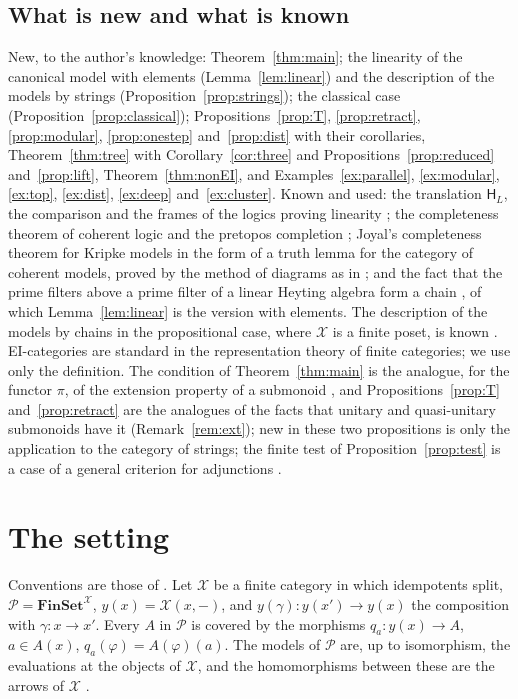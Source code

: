 \documentclass[11pt]{amsart}
\theoremstyle{definition}
\newcommand{\Fin}{\mathbf{FinSet}}
\newcommand{\HH}{\mathsf H}
\newcommand{\cX}{\mathcal X}
\newcommand{\cP}{\mathcal P}
\begin{document}
\subsection*{What is new and what is known}
New, to the author's knowledge: Theorem~\ref{thm:main}; the linearity
of the canonical model with elements (Lemma~\ref{lem:linear}) and the
description of the models by strings
(Proposition~\ref{prop:strings}); the classical case
(Proposition~\ref{prop:classical}); Propositions~\ref{prop:T},
\ref{prop:retract}, \ref{prop:modular}, \ref{prop:onestep}
and~\ref{prop:dist} with
their corollaries, Theorem~\ref{thm:tree} with
Corollary~\ref{cor:three} and Propositions~\ref{prop:reduced}
and~\ref{prop:lift}, Theorem~\ref{thm:nonEI}, and Examples~\ref{ex:parallel},
\ref{ex:modular}, \ref{ex:top}, \ref{ex:dist}, \ref{ex:deep} and~\ref{ex:cluster}. Known and used:
the translation $\HH_L$, the comparison and the frames of the logics
proving linearity \cite{Interm}; the completeness theorem of coherent
logic and the pretopos completion \cite{Elephant}; Joyal's completeness
theorem for Kripke models in the form of a truth lemma for the
category of coherent models, proved by the method of diagrams as in
\cite[Lemma~7.13]{Heyting}; and the fact that the prime filters above
a prime filter of a linear Heyting algebra form a chain \cite{Horn69},
of which Lemma~\ref{lem:linear} is the version with elements.
The description of the models by chains in the propositional case,
where $\cX$ is a finite poset, is known \cite{AGM08,Carai,Interm}.
EI-categories are standard in the representation theory of finite
categories; we use only the definition. The condition of
Theorem~\ref{thm:main} is the analogue, for the functor $\pi$, of the
extension property of a submonoid \cite{Renshaw86}, and
Propositions~\ref{prop:T} and~\ref{prop:retract} are the analogues of
the facts that unitary and quasi-unitary submonoids have it
\cite{RenshawThesis} (Remark~\ref{rem:ext}); new in these two
propositions is only the application to the category of strings; the finite test of
Proposition~\ref{prop:test} is a case of a general criterion for
adjunctions \cite{Mesablishvili}.

\section{The setting}\label{sec:setting}

Conventions are those of \cite{Interm,Heyting}. Let $\cX$ be a finite
category in which idempotents split, $\cP=\Fin^{\cX}$, $y(x)=\cX(x,-)$,
and $y(\gamma)\colon y(x')\to y(x)$ the composition with $\gamma\colon
x\to x'$. Every $A$ in $\cP$ is covered by the morphisms $q_a\colon
y(x)\to A$, $a\in A(x)$, $q_a(\varphi)=A(\varphi)(a)$. The models of
$\cP$ are, up to isomorphism, the evaluations at the objects of $\cX$,
and the homomorphisms between these are the arrows of $\cX$
\cite[\S7]{Heyting}.
\end{document}

